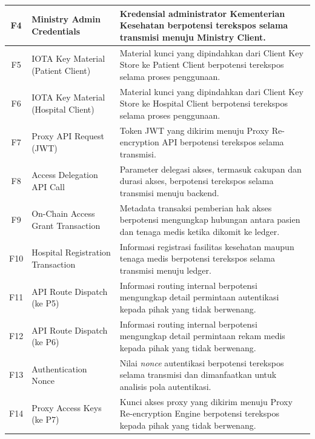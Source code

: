 \begin{xltabular}{\textwidth}{|c|>{\raggedright\arraybackslash}p{3.2cm}|X|}
    F4 &
    Ministry Admin Credentials &
    Kredensial administrator Kementerian Kesehatan berpotensi terekspos selama transmisi menuju Ministry Client. \\
    \hline

    F5 &
    IOTA Key Material (Patient Client) &
    Material kunci yang dipindahkan dari Client Key Store ke Patient Client berpotensi terekspos selama proses penggunaan. \\
    \hline

    F6 &
    IOTA Key Material (Hospital Client) &
    Material kunci yang dipindahkan dari Client Key Store ke Hospital Client berpotensi terekspos selama proses penggunaan. \\
    \hline

    F7 &
    Proxy API Request (JWT) &
    Token JWT yang dikirim menuju Proxy Re-encryption API berpotensi terekspos selama transmisi. \\
    \hline

    F8 &
    Access Delegation API Call &
    Parameter delegasi akses, termasuk cakupan dan durasi akses, berpotensi terekspos selama transmisi menuju backend. \\
    \hline

    F9 &
    On-Chain Access Grant Transaction &
    Metadata transaksi pemberian hak akses berpotensi mengungkap hubungan antara pasien dan tenaga medis ketika dikomit ke ledger. \\
    \hline

    F10 &
    Hospital Registration Transaction &
    Informasi registrasi fasilitas kesehatan maupun tenaga medis berpotensi terekspos selama transmisi menuju ledger. \\
    \hline

    F11 &
    API Route Dispatch (ke P5) &
    Informasi routing internal berpotensi mengungkap detail permintaan autentikasi kepada pihak yang tidak berwenang. \\
    \hline

    F12 &
    API Route Dispatch (ke P6) &
    Informasi routing internal berpotensi mengungkap detail permintaan rekam medis kepada pihak yang tidak berwenang. \\
    \hline

    F13 &
    Authentication Nonce &
    Nilai \textit{nonce} autentikasi berpotensi terekspos selama transmisi dan dimanfaatkan untuk analisis pola autentikasi. \\
    \hline

    F14 &
    Proxy Access Keys (ke P7) &
    Kunci akses proxy yang dikirim menuju Proxy Re-encryption Engine berpotensi terekspos kepada pihak yang tidak berwenang. \\
    \hline


\end{xltabular}
